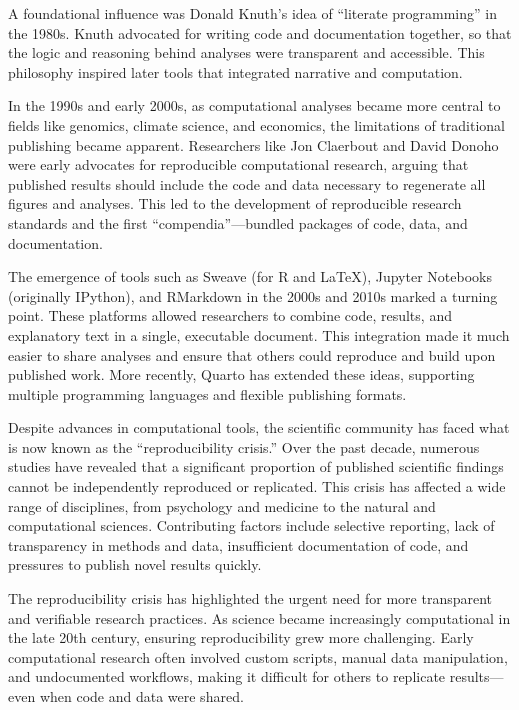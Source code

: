 \documentclass[
  letterpaper,
  DIV=11,
  numbers=noendperiod]{scrreprt}
\begin{document}
A foundational influence was Donald Knuth's idea of ``literate
programming'' in the 1980s. Knuth advocated for writing code and
documentation together, so that the logic and reasoning behind analyses
were transparent and accessible. This philosophy inspired later tools
that integrated narrative and computation.

In the 1990s and early 2000s, as computational analyses became more
central to fields like genomics, climate science, and economics, the
limitations of traditional publishing became apparent. Researchers like
Jon Claerbout and David Donoho were early advocates for reproducible
computational research, arguing that published results should include
the code and data necessary to regenerate all figures and analyses. This
led to the development of reproducible research standards and the first
``compendia''---bundled packages of code, data, and documentation.

The emergence of tools such as Sweave (for R and LaTeX), Jupyter
Notebooks (originally IPython), and RMarkdown in the 2000s and 2010s
marked a turning point. These platforms allowed researchers to combine
code, results, and explanatory text in a single, executable document.
This integration made it much easier to share analyses and ensure that
others could reproduce and build upon published work. More recently,
Quarto has extended these ideas, supporting multiple programming
languages and flexible publishing formats.

Despite advances in computational tools, the scientific community has
faced what is now known as the ``reproducibility crisis.'' Over the past
decade, numerous studies have revealed that a significant proportion of
published scientific findings cannot be independently reproduced or
replicated. This crisis has affected a wide range of disciplines, from
psychology and medicine to the natural and computational sciences.
Contributing factors include selective reporting, lack of transparency
in methods and data, insufficient documentation of code, and pressures
to publish novel results quickly.

The reproducibility crisis has highlighted the urgent need for more
transparent and verifiable research practices. As science became
increasingly computational in the late 20th century, ensuring
reproducibility grew more challenging. Early computational research
often involved custom scripts, manual data manipulation, and
undocumented workflows, making it difficult for others to replicate
results---even when code and data were shared.
\end{document}
